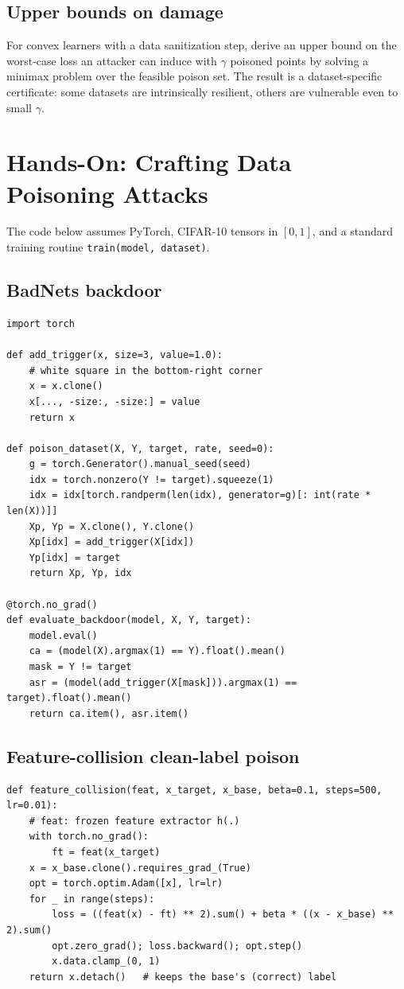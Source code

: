 \documentclass[10pt,a4paper]{extarticle}
\theoremstyle{definition}
\begin{document}
\subsection{Upper bounds on damage}

For convex learners with a data sanitization step, \citet{steinhardt2017certified} derive an upper bound on the worst-case loss an attacker can induce with \(\gamma\) poisoned points by solving a minimax problem over the feasible poison set. The result is a dataset-specific certificate: some datasets are intrinsically resilient, others are vulnerable even to small \(\gamma\).

\section{Hands-On: Crafting Data Poisoning Attacks}

The code below assumes PyTorch, CIFAR-10 tensors in \([0,1]\), and a standard training routine \texttt{train(model, dataset)}.

\subsection{BadNets backdoor}

\begin{lstlisting}
import torch

def add_trigger(x, size=3, value=1.0):
    # white square in the bottom-right corner
    x = x.clone()
    x[..., -size:, -size:] = value
    return x

def poison_dataset(X, Y, target, rate, seed=0):
    g = torch.Generator().manual_seed(seed)
    idx = torch.nonzero(Y != target).squeeze(1)
    idx = idx[torch.randperm(len(idx), generator=g)[: int(rate * len(X))]]
    Xp, Yp = X.clone(), Y.clone()
    Xp[idx] = add_trigger(X[idx])
    Yp[idx] = target
    return Xp, Yp, idx

@torch.no_grad()
def evaluate_backdoor(model, X, Y, target):
    model.eval()
    ca = (model(X).argmax(1) == Y).float().mean()
    mask = Y != target
    asr = (model(add_trigger(X[mask])).argmax(1) == target).float().mean()
    return ca.item(), asr.item()
\end{lstlisting}

\subsection{Feature-collision clean-label poison}

\begin{lstlisting}
def feature_collision(feat, x_target, x_base, beta=0.1, steps=500, lr=0.01):
    # feat: frozen feature extractor h(.)
    with torch.no_grad():
        ft = feat(x_target)
    x = x_base.clone().requires_grad_(True)
    opt = torch.optim.Adam([x], lr=lr)
    for _ in range(steps):
        loss = ((feat(x) - ft) ** 2).sum() + beta * ((x - x_base) ** 2).sum()
        opt.zero_grad(); loss.backward(); opt.step()
        x.data.clamp_(0, 1)
    return x.detach()   # keeps the base's (correct) label
\end{lstlisting}
\end{document}
